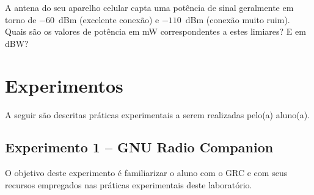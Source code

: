 \documentclass[12pt,addpoints]{exam}
\begin{document}
\begin{questions}
 \question A antena do seu aparelho celular capta uma potência de sinal geralmente em torno de $-60$~dBm (excelente conexão) e $-110$~dBm (conexão muito ruim). Quais são os valores de potência em mW correspondentes a estes limiares? E em dBW?
  \end{questions}


\section{Experimentos}

A seguir são descritas práticas experimentais a serem realizadas pelo(a) aluno(a). 

\subsection{Experimento 1 -- GNU Radio Companion}

O objetivo deste experimento é familiarizar o aluno com o GRC e com seus recursos empregados nas práticas experimentais deste laboratório.
\end{document}
